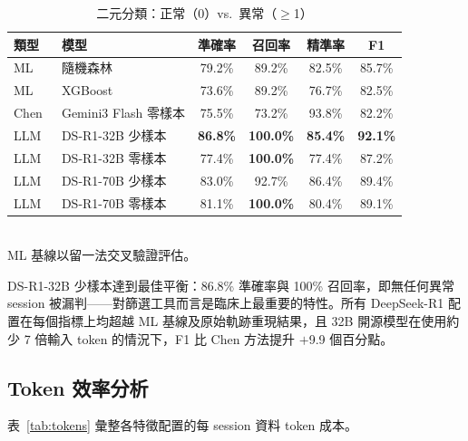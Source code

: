 \documentclass[12pt, a4paper]{article}
\begin{document}
\begin{table}[htbp]
    \centering
    \caption{二元分類：正常（0）vs.\ 異常（$\geq$1）}
    \label{tab:binary}
    \renewcommand{\arraystretch}{1.2}
    \begin{tabular}{llcccc}
        \toprule
        \textbf{類型} & \textbf{模型} & \textbf{準確率} & \textbf{召回率} & \textbf{精準率} & \textbf{F1} \\
        \midrule
        \rowcolor{gray!15} ML & 隨機森林 & 79.2\% & 89.2\% & 82.5\% & 85.7\% \\
        \rowcolor{gray!15} ML & XGBoost  & 73.6\% & 89.2\% & 76.7\% & 82.5\% \\
        \midrule
        Chen~\cite{chen2024chatgpt} & Gemini3 Flash 零樣本 & 75.5\% & 73.2\% & 93.8\% & 82.2\% \\
        \midrule
        LLM & DS-R1-32B 少樣本 & \textbf{86.8\%} & \textbf{100.0\%} & \textbf{85.4\%} & \textbf{92.1\%} \\
        LLM & DS-R1-32B 零樣本 & 77.4\% & \textbf{100.0\%} & 77.4\% & 87.2\% \\
        LLM & DS-R1-70B 少樣本 & 83.0\% & 92.7\% & 86.4\% & 89.4\% \\
        LLM & DS-R1-70B 零樣本 & 81.1\% & \textbf{100.0\%} & 80.4\% & 89.1\% \\
        \bottomrule
    \end{tabular}
    \\[0.3em]
    {\small ML 基線以留一法交叉驗證評估。}
\end{table}

DS-R1-32B 少樣本達到最佳平衡：86.8\% 準確率與 100\% 召回率，即無任何異常 session 被漏判——對篩選工具而言是臨床上最重要的特性。所有 DeepSeek-R1 配置在每個指標上均超越 ML 基線及原始軌跡重現結果，且 32B 開源模型在使用約少 7 倍輸入 token 的情況下，F1 比 Chen 方法提升 $+$9.9 個百分點。

\subsection{Token 效率分析}

表~\ref{tab:tokens} 彙整各特徵配置的每 session 資料 token 成本。
\end{document}
